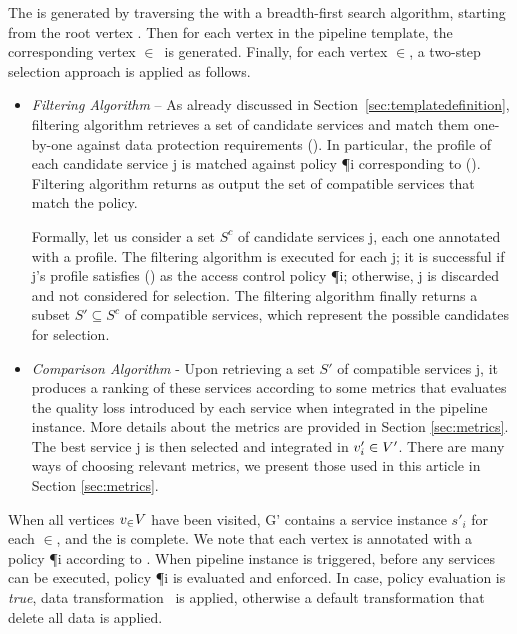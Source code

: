 
  The \pipelineInstance  is generated by traversing the \pipelineTemplate with a breadth-first search algorithm, starting from the root vertex .
  Then for each vertex  in the pipeline template, the corresponding vertex $\in$\Vp\ is generated.
  Finally, for each vertex $\in$\Vp, a two-step selection approach is applied as follows.
  \begin{itemize}

    \item \textit{Filtering Algorithm} -- As already discussed in Section~\ref{sec:templatedefinition}, filtering algorithm retrieves a set of candidate services and match them one-by-one against data protection requirements \myLambda(). In particular, the profile of each candidate service \si{j} is matched against policy \P{i} corresponding to \myLambda(). Filtering algorithm returns as output the set of compatible services that match the policy. 
    
    Formally, let us consider a set $S^c$ of candidate services \si{j}, each one annotated with a profile. The filtering algorithm is executed for each \si{j}; it is successful if \si{j}'s profile satisfies \myLambda() as the access control policy \P{i}; otherwise, \si{j} is discarded and not considered for selection. The filtering algorithm finally returns a subset $S'\subseteq S^c$ of compatible services, which represent the possible candidates for selection.

    \item \textit{Comparison Algorithm} - Upon retrieving a set $S'$ of compatible services \si{j}, it produces a ranking of these services according to some metrics that evaluates the quality loss introduced by each service when integrated in the pipeline instance. More details about the metrics are provided in Section \ref{sec:metrics}. 
    The best service \si{j} is then selected and integrated in $v'_{i}\in V'$. There are many ways of choosing relevant metrics, we present those used in this article in Section \ref{sec:metrics}.
  \end{itemize}

  When all vertices $v_{\in} V$ have been visited, G' contains a service instance $s'_i$ for each $\in$\Vp, and the \pipelineInstance is complete. We note that each vertex  is annotated with a policy \P{i} according to \myLambda. When pipeline instance is triggered, before any services can be executed, policy \P{i} is evaluated and enforced. In case, policy evaluation is \emph{true}, data transformation \TP\ is applied, otherwise a default transformation that delete all data is applied.

